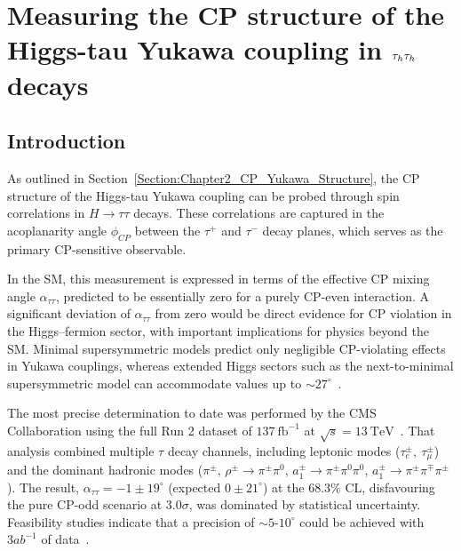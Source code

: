 \chapter{\texorpdfstring{Measuring the CP structure of the Higgs-tau Yukawa coupling in $\tau_h \tau_h$ decays}{Measurement of the CP structure of the Higgs-tau Yukawa coupling in tauh tauh decays}}
\thispagestyle{plain}  %
\pagestyle{chapterpages}
\label{Section:Chapter_CP}
\minitoc

\section{Introduction}

As outlined in Section~\ref{Section:Chapter2_CP_Yukawa_Structure}, the CP structure of the Higgs-tau Yukawa coupling can be probed through spin correlations in $H \to \tau\tau$ decays. These correlations are captured in the acoplanarity angle $\phi_{CP}$ between the $\tau^+$ and $\tau^-$ decay planes, which serves as the primary CP-sensitive observable.

In the \ac{SM}, this measurement is expressed in terms of the effective CP mixing angle $\alpha_{\tau\tau}$, predicted to be essentially zero for a purely CP-even interaction. A significant deviation of $\alpha_{\tau\tau}$ from zero would be direct evidence for CP violation in the Higgs–fermion sector, with important implications for physics beyond the \ac{SM}. Minimal supersymmetric models predict only negligible CP-violating effects in Yukawa couplings, whereas extended Higgs sectors such as the next-to-minimal supersymmetric model can accommodate values up to ${\sim}27^\circ$~\cite{King:2015oxa}.

The most precise determination to date was performed by the \ac{CMS} Collaboration using the full Run 2 dataset of $137~\mathrm{fb}^{-1}$ at $\sqrt{s} = 13~\mathrm{TeV}$~\cite{HiggsCP_CMS_2021}. That analysis combined multiple $\tau$ decay channels, including leptonic modes ($\tau_e^\pm,\ \tau_\mu^\pm$) and the dominant hadronic modes ($\pi^\pm$, $\rho^\pm \to \pi^\pm \pi^0$, $a_1^\pm \to \pi^\pm \pi^0 \pi^0$, $a_1^\pm \to \pi^\pm \pi^\mp \pi^\pm$). The result, $\alpha_{\tau\tau} = -1 \pm 19^\circ$ (expected $0 \pm 21^\circ$) at the 68.3\% CL, disfavouring the pure CP-odd scenario at $3.0\sigma$, was dominated by statistical uncertainty. Feasibility studies indicate that a precision of ${\sim}5$-$10^\circ$ could be achieved with $3\unit{ab}^{-1}$ of data~\cite{Harnik:2013aja,Berge:2014sra}.

